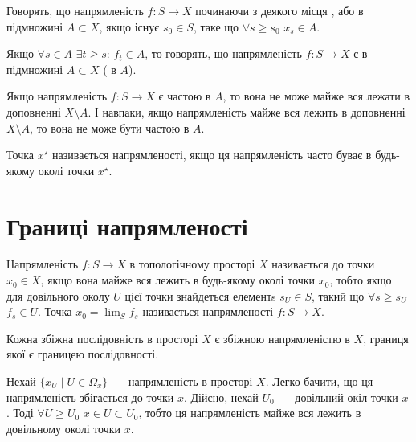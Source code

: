 \begin{definition}
    Говорять, що напрямленість $f : S \to X$ починаючи з деякого місця , або  в підмножині $A \subset X$, якщо існує $s_0 \in S$, таке що $\forall s \ge s_0$ $x_s \in A$.
\end{definition}

\begin{definition}
    Якщо $\forall s \in A$ $\exists t \ge s$: $f_t \in A$, то говорять, що напрямленість $f: S \to X$ є  в підмножині $A \subset X$ ( в $A$).
\end{definition}

\begin{remark}
    Якщо напрямленість $f: S \to X$ є частою в $A$, то вона не може майже вся лежати в доповненні $X \setminus A$. І навпаки, якщо напрямленість майже вся лежить в доповненні $X \setminus A$, то вона не може бути частою в $A$.
\end{remark}

\begin{definition}
    Точка $x^\star$ називається  напрямленості, якщо ця напрямленість часто буває в будь-якому околі точки $x^\star$.
\end{definition}

\section{Границі напрямленості}

\begin{definition}
    Напрямленість $f: S \to X$ в топологічному просторі $X$ називається  до точки $x_0 \in X$, якщо вона майже вся лежить в будь-якому околі точки $x_0$, тобто якщо для довільного околу $U$ цієї точки знайдеться елементs $s_U \in S$, такий що $\forall s \ge s_U$ $f_s \in U$. Точка $x_0 = \lim_S f_s$ називається  напрямленості $f: S \to X$.
\end{definition}

\begin{example}
    Кожна збіжна послідовність в просторі $X$ є збіжною напрямленістю в $X$, границя якої є границею послідовності.
\end{example}

\begin{example}
    Нехай $\{x_U \mid U \in \Omega_x\}$~--- напрямленість в просторі $X$. Легко бачити, що ця напрямленість збігається до точки $x$. Дійсно, нехай $U_0$~--- довільний окіл точки $x$. Тоді $\forall U \ge U_0$ $x \in U \subset U_0$, тобто ця напрямленість майже вся лежить в довільному околі точки $x$.
\end{example}

